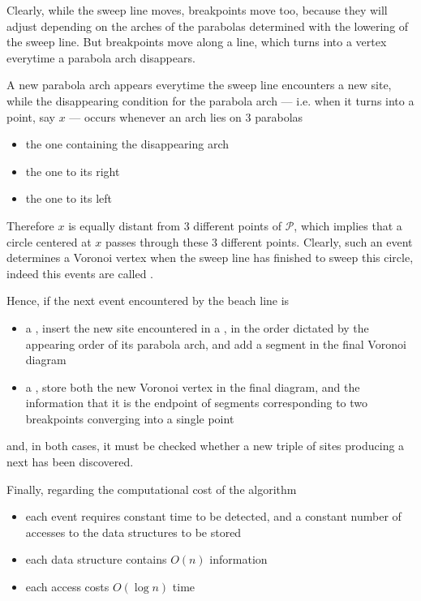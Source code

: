 \documentclass[a4paper, 12pt]{report}
\begin{document}

    Clearly, while the sweep line moves, breakpoints move too, because they will adjust depending on the arches of the parabolas determined with the lowering of the sweep line. But breakpoints move along a line, which turns into a vertex everytime a parabola arch disappears.


    A new parabola arch appears everytime the sweep line encounters a new site, while the disappearing condition for the parabola arch --- i.e. when it turns into a point, say $x$ --- occurs whenever an arch lies on 3 parabolas

    \begin{itemize}
        \item the one containing the disappearing arch
        \item the one to its right
        \item the one to its left
    \end{itemize}

    Therefore $x$ is equally distant from 3 different points of $\mathcal P$, which implies that a circle centered at $x$ passes through these 3 different points. Clearly, such an event determines a Voronoi vertex when the sweep line has finished to sweep this circle, indeed this events are called .

    Hence, if the next event encountered by the beach line is

    \begin{itemize}
        \item a , insert the new site encountered in a , in the order dictated by the appearing order of its parabola arch, and add a segment in the final Voronoi diagram
        \item a , store both the new Voronoi vertex in the final diagram, and the information that it is the endpoint of segments corresponding to two breakpoints converging into a single point
    \end{itemize}

    and, in both cases, it must be checked whether a new triple of sites producing a next  has been discovered.
    
    Finally, regarding the computational cost of the algorithm

    \begin{itemize}
        \item each event requires constant time to be detected, and a constant number of accesses to the data structures to be stored
        \item each data structure contains $O(n)$ information
        \item each access costs $O(\log n)$ time
    \end{itemize}
\end{document}
